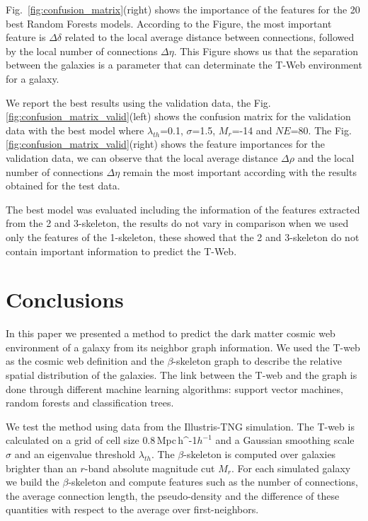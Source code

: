 \documentclass[usenatbib]{mnras}
\newcommand{\Mpch}{\,{\rm Mpc}\,\ifmmode h^{-1}\else $h^{-1}$\fi}
\begin{document}
Fig.~\ref{fig:confusion_matrix}(right) shows the importance of the features
for the 20 best Random Forests models. According to the Figure, the 
most important feature is $\Delta \delta$
related to the local average distance between connections, followed by
the local number of connections $\Delta \eta$. This Figure shows
us that the separation between the galaxies is a parameter that can determinate the T-Web environment for a galaxy. 

We report the best results using the validation data, the Fig. \ref{fig:confusion_matrix_valid}(left) shows the confusion matrix for the validation data with the best model where $\lambda_{th}$=0.1, $\sigma$=1.5, $M_r$=-14 and $NE$=80. The Fig. \ref{fig:confusion_matrix_valid}(right) shows the feature importances for the validation data, we can observe that the local average distance $\Delta \rho$ and the local number of connections $\Delta \eta$ remain the most important according with the results obtained for the test data.

The best model was evaluated including the information of the features
extracted from the 2 and 3-skeleton, the results do not vary in
comparison when we used only the features of the 1-skeleton, these
showed that the 2 and 3-skeleton do not contain important information
to predict the T-Web. 

\section{Conclusions}\label{sec:conclusions}

In this paper we presented a method to predict the dark matter cosmic web
environment of a galaxy from its neighbor graph information.
We used the T-web as the cosmic web definition \citep{Forero-Romero2009}
and the $\beta$-skeleton graph \citep{Fang2019} 
to describe the relative spatial distribution of the galaxies. 
The link between the T-web and the graph is done through different
machine learning algorithms: support vector machines, random forests and
classification trees.

We test the method using data from the Illustris-TNG simulation.
The T-web is calculated on a grid of cell size $0.8$\Mpch 
and a Gaussian smoothing scale $\sigma$ and an eigenvalue threshold $\lambda_{th}$.
The $\beta$-skeleton is computed over galaxies brighter than 
an $r$-band absolute magnitude cut $M_{r}$.
For each simulated galaxy we build the $\beta$-skeleton and
compute features such as the number of connections, the average connection
length, the pseudo-density and the difference of these quantities with
respect to the average over first-neighbors.
\end{document}
